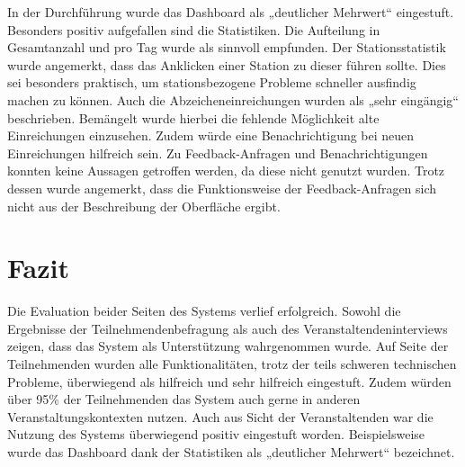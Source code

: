 In der Durchführung wurde das Dashboard als „deutlicher Mehrwert“ eingestuft.
Besonders positiv aufgefallen sind die Statistiken. Die Aufteilung in
Gesamtanzahl und pro Tag wurde als sinnvoll empfunden. Der Stationsstatistik
wurde angemerkt, dass das Anklicken einer Station zu dieser führen sollte. Dies
sei besonders praktisch, um stationsbezogene Probleme schneller ausfindig machen
zu können. Auch die Abzeicheneinreichungen wurden als „sehr eingängig“
beschrieben. Bemängelt wurde hierbei die fehlende Möglichkeit alte Einreichungen
einzusehen. Zudem würde eine Benachrichtigung bei neuen Einreichungen hilfreich
sein. Zu Feedback-Anfragen und Benachrichtigungen konnten keine Aussagen
getroffen werden, da diese nicht genutzt wurden. Trotz dessen wurde angemerkt,
dass die Funktionsweise der Feedback-Anfragen sich nicht aus der Beschreibung
der Oberfläche ergibt.

\section{Fazit}

Die Evaluation beider Seiten des Systems verlief erfolgreich. Sowohl die
Ergebnisse der Teilnehmendenbefragung als auch des Veranstaltendeninterviews
zeigen, dass das System als Unterstützung wahrgenommen wurde. Auf Seite der
Teilnehmenden wurden alle Funktionalitäten, trotz der teils schweren technischen
Probleme, überwiegend als hilfreich und sehr hilfreich eingestuft. Zudem würden
über 95\% der Teilnehmenden das System auch gerne in anderen
Veranstaltungskontexten nutzen. Auch aus Sicht der Veranstaltenden war die
Nutzung des Systems überwiegend positiv eingestuft worden. Beispielsweise wurde
das Dashboard dank der Statistiken als „deutlicher Mehrwert“ bezeichnet.



